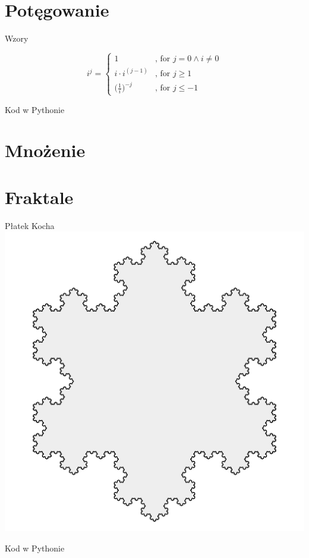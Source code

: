 \section{Potęgowanie}\label{sec:exponentiation}
\begin{frame}{Wzory}
    \begin{definition}[recursion]
        \[ i^j =
        \begin{cases}
            1 & \text{, for } j = 0 \land i \neq 0 \\
            i \cdot i^{(j-1)} & \text{, for } j \geq 1 \\
            \Big( \frac{1}{i} \Big) ^{-j} & \text{, for } j \leq -1
        \end{cases}
        \]
    \end{definition}
\end{frame}
\begin{frame}{Kod w Pythonie}
    
    
\end{frame}


\section{Mnożenie}\label{sec:multiplication}



\section{Fraktale}\label{sec:fractals}
\begin{frame}{Płatek Kocha}
    \centering
    \includegraphics[height=0.8\textheight]{recursion/graphics/koch_snowflake.png}
\end{frame}
\begin{frame}{Kod w Pythonie}
    
    
\end{frame}


